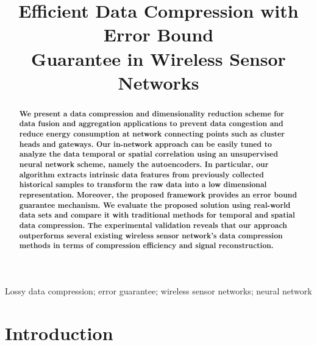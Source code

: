\documentclass[a4paper,onecolumn,conference]{IEEEtran}
\begin{document}
\title{Efficient Data Compression with Error Bound \\ Guarantee in Wireless Sensor Networks}

\author{


}

\maketitle
\begin{abstract}
\textbf{We present a data compression and dimensionality reduction scheme for data fusion and aggregation applications to prevent data congestion and reduce energy consumption at network connecting points such as cluster heads and gateways. Our in-network approach can be easily tuned to analyze the data temporal or spatial correlation using an unsupervised neural network scheme, namely the autoencoders. In particular, our algorithm extracts intrinsic data features from previously collected historical samples to transform the raw data into a low dimensional representation. Moreover, the proposed framework provides an error bound guarantee mechanism. We evaluate the proposed solution using real-world data sets and compare it with traditional methods for temporal and spatial data compression. The experimental validation reveals that our approach outperforms several existing wireless sensor network's data compression methods in terms of compression efficiency and signal reconstruction.} 
\end{abstract}

\begin{IEEEkeywords}
Lossy data compression; error guarantee; wireless sensor networks; neural network
\end{IEEEkeywords}


\section{Introduction}
\end{document}

